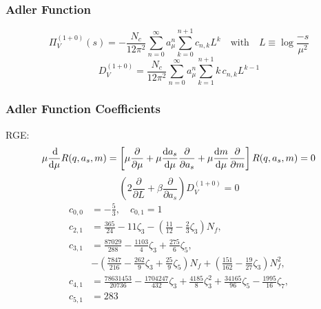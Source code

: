 \documentclass[fleqn]{beamer}
\begin{document}
\begin{frame}
  \frametitle{Adler Function}
  \begin{equation}
    \Pi_V^{(1+0)}(s) = - \frac{N_c}{12 \pi^2} \sum_{n=0}^\infty a_\mu^n \sum_{k=0}^{n+1} c_{n,k} L^k
    \quad \text{with} \quad L \equiv \log \frac{-s}{\mu^2}
  \end{equation}
  \normalsize
  \pause
  \begin{equation}
    D_V^{(1+0)} = \frac{N_c}{12 \pi^2} \sum_{n=0}^\infty a_\mu^n \sum_{k=1}^{n+1} k\, c_{n,k} L^{k-1}
  \end{equation}
  \pause
\end{frame}
\begin{frame}
  \frametitle{Adler Function Coefficients}
  RGE:
  \begin{equation}
    \mu \frac{\dif}{\dif \mu} R(q, a_s, m) = \left[ \mu \frac{\partial}{\partial \mu} + \mu \frac{\dif a_s}{\dif \mu} \frac{\partial}{\partial a_s} + \mu \frac{\dif m}{\dif \mu} \frac{\partial}{\partial m} \right] R(q, a_s, m) = 0
  \end{equation}
  \begin{equation}
    \left(2 \frac{\partial}{\partial L} + \beta \frac{\partial}{\partial a_s} \right) D_V^{(1+0)} = 0
  \end{equation}
  \tiny
  \begin{equation}
    \begin{split}
      c_{0,0} &= -\frac{5}{3}, \quad c_{0,1} = 1 \\
      c_{2,1} &= \frac{365}{24} - 11 \zeta_3 - \left( \frac{11}{12} - \frac{2}{3}\zeta_3 \right) N_f, \\
      c_{3,1} &= \frac{87029}{288} - \frac{1103}{4} \zeta_3 + \frac{275}{6}\zeta_5, \\
      &- \left( \frac{7847}{216} - \frac{262}{9} \zeta_3 + \frac{25}{9} \zeta_5 \right) N_f + \left( \frac{151}{162} - \frac{19}{27}\zeta_3\right)N_f^2, \\
      c_{4,1} &= \frac{78631453}{20736} - \frac{1704247}{432}\zeta_3 +
      \frac{4185}{8}\zeta_3^2 + \frac{34165}{96}\zeta_5 - \frac{1995}{16}\zeta_7, \\
      c_{5,1} &= 283
    \end{split}
  \end{equation}
\end{frame}
\end{document}
